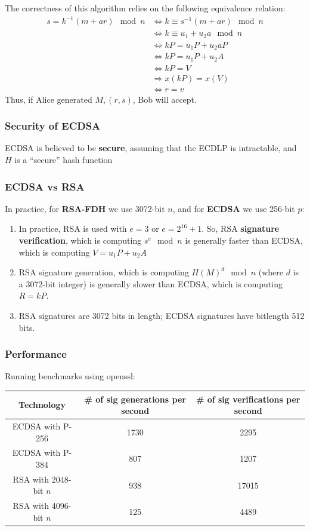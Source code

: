 \documentclass[12pt,titlepage]{article}
\begin{document}
The correctness of this algorithm relies on the following equivalence relation: \begin{align*}
	s = k^{-1}(m+ar) \mod n &\Leftrightarrow k \equiv s^{-1}(m+ar) \mod n\\
	&\Leftrightarrow k \equiv u_1 + u_2a \mod n\\
	&\Leftrightarrow kP = u_1P + u_2aP\\
	&\Leftrightarrow kP = u_1P + u_2A\\
	&\Leftrightarrow kP = V\\
	&\Rightarrow x(kP) = x(V)\\
	&\Leftrightarrow r = v
\end{align*}
Thus, if Alice generated $M, (r,s)$, Bob will accept. 

\subsubsection{Security of ECDSA}
ECDSA is believed to be \textbf{secure}, assuming that the ECDLP is intractable, and $H$ is a ``secure'' hash function

\subsubsection{ECDSA vs RSA}
In practice, for \textbf{RSA-FDH} we use 3072-bit $n$, and for \textbf{ECDSA} we use 256-bit $p$: \begin{enumerate}
	\item In practice, RSA is used with $e = 3$ or $e = 2^{16}+1$. So, RSA \textbf{signature verification}, which is computing $s^e \mod n$ is generally faster than ECDSA, which is computing $V = u_1P+u_2A$
	\item RSA signature generation, which is computing $H(M)^d \mod n$ (where $d$ is a 3072-bit integer) is generally slower than ECDSA, which is computing $R = kP$. 
	\item RSA signatures are 3072 bits in length; ECDSA signatures have bitlength 512 bits. 
\end{enumerate}

\subsubsection{Performance}
Running benchmarks using openssl: \begin{center}
	\begin{tabular}{|c|c|c|}
		\hline
		Technology&\# of sig generations per second & \# of sig verifications per second\\
		\hline
		ECDSA with P-256 & 1730 & 2295\\
		ECDSA with P-384 & 807 & 1207\\
		RSA with 2048-bit $n$ & 938 & 17015\\
		RSA with 4096-bit $n$ & 125 & 4489\\
		\hline
	\end{tabular}
\end{center}
\end{document}
